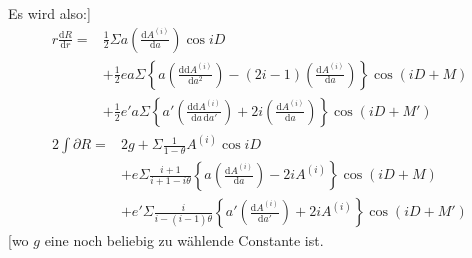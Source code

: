 Es wird also:]
\[
\begin{aligned}
r\frac{\mathrm{d}R}{\mathrm{d}r}={}&\tfrac12\Sigma a\left(\frac{\mathrm{d}A^{(i)}}{\mathrm{d}a}\right)\cos iD\\
&+\tfrac12 ea\Sigma\left\{a\left(\frac{\mathrm{d}\mathrm{d}A^{(i)}}{\mathrm{d}a^2}\right)-(2i-1)\left(\frac{\mathrm{d}A^{(i)}}{\mathrm{d}a}\right)\right\}\cos(iD+M)\\
&+\tfrac12 e'a\Sigma\left\{a'\left(\frac{\mathrm{d}\mathrm{d}A^{(i)}}{\mathrm{d}a\,\mathrm{d}a'}\right)+2i\left(\frac{\mathrm{d}A^{(i)}}{\mathrm{d}a}\right)\right\}\cos(iD+M')
\end{aligned}
\]
\noindent[und wegen \(\mathrm{d}r=-ae\sin M\mathord{.}\,n\mathrm{d}t\), \(\mathrm{d}V=(1-2e\cos M)n\mathrm{d}t\):
\[
\begin{aligned}
\frac{\partial R}{n\mathrm{d}t}={}&-\tfrac12\Sigma iA^{(i)}\sin iD\\
&-\tfrac12 e\Sigma(i+1)\left\{a\left(\frac{\mathrm{d}A^{(i)}}{\mathrm{d}a}\right)-2iA^{(i)}\right\}\sin(iD+M)\\
&-\tfrac12 e'\Sigma i\left\{a'\left(\frac{\mathrm{d}A^{(i)}}{\mathrm{d}a'}\right)+2iA^{(i)}\right\}\sin(iD+M')
\end{aligned}
\]
\noindent und hieraus, wenn man
\[\theta=\frac{n'}{n}\]
\noindent setzt:]
\[
\begin{aligned}
2\int\partial R={}&2g+\Sigma\frac{1}{1-\theta}A^{(i)}\cos iD\\
&+e\Sigma\frac{i+1}{i+1-i\theta}\left\{a\left(\frac{\mathrm{d}A^{(i)}}{\mathrm{d}a}\right)-2iA^{(i)}\right\}\cos(iD+M)\\
&+e'\Sigma\frac{i}{i-(i-1)\theta}\left\{a'\left(\frac{\mathrm{d}A^{(i)}}{\mathrm{d}a'}\right)+2iA^{(i)}\right\}\cos(iD+M')
\end{aligned}
\]
\noindent[wo \(g\) eine noch beliebig zu wählende Constante ist.

